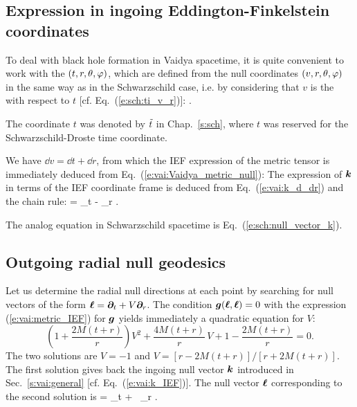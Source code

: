 \subsection{Expression in ingoing Eddington-Finkelstein coordinates} \label{s:vai:IEF}

To deal with black hole formation in Vaidya spacetime, it is quite
convenient to work with the
$(t,r,\theta,\varphi)$, which are defined from the null coordinates $(v,r,\theta,\varphi)$ in the
same way as in the Schwarzschild case, i.e. by considering that $v$ is the
 with respect to $t$
[cf. Eq.~(\ref{e:sch:ti_v_r})]:
\be  \label{e:vai:t_v_r}
     \iff {} .
\ee
\begin{remark}
The coordinate $t$ was denoted by ${\tilde t}$ in Chap.~\ref{s:sch}, where $t$
was reserved for the Schwarzschild-Droste time coordinate.
\end{remark}
We have $\dd v = \dd t + \dd r$, from which the IEF expression of the
metric tensor is immediately deduced from Eq.~(\ref{e:vai:Vaidya_metric_null}):
\be \label{e:vai:metric_IEF}
\ee
The expression of $\bm{k}$ in terms of the IEF coordinate frame
is deduced from Eq.~(\ref{e:vai:k_d_dr}) and the chain rule:
\be \label{e:vai:k_IEF}
     = \wpar_t - \wpar_r .
\ee
\begin{remark}
The analog equation in Schwarzschild spacetime is Eq.~(\ref{e:sch:null_vector_k}).
\end{remark}

\subsection{Outgoing radial null geodesics}

Let us determine the radial null directions at each point by searching for
null vectors of the form $\bm{\ell} = \bm{\partial}_t + V \bm{\partial}_r$. The condition
$\bm{g}(\bm{\ell}, \bm{\ell}) = 0$ with the expression (\ref{e:vai:metric_IEF}) for
$\bm{g}$ yields immediately a quadratic equation for $V$:
\[
    \left( 1 + \frac{2 M(t+r)}{r} \right) V^2
    + \frac{4 M(t + r)}{r}\, V +
    1 - \frac{2 M(t+ r)}{r}  = 0 .
\]
The two solutions are $V = -1$ and $V = [r - 2M(t + r)]/[r + 2M(t+r)]$.
The first solution gives back the ingoing null vector $\bm{k}$ introduced in Sec.~\ref{s:vai:general}
[cf. Eq.~(\ref{e:vai:k_IEF})].
The null vector $\bm{\ell}$ corresponding to the second solution is
\be
    \wl = \wpar_t + \, \wpar_r .
\ee

